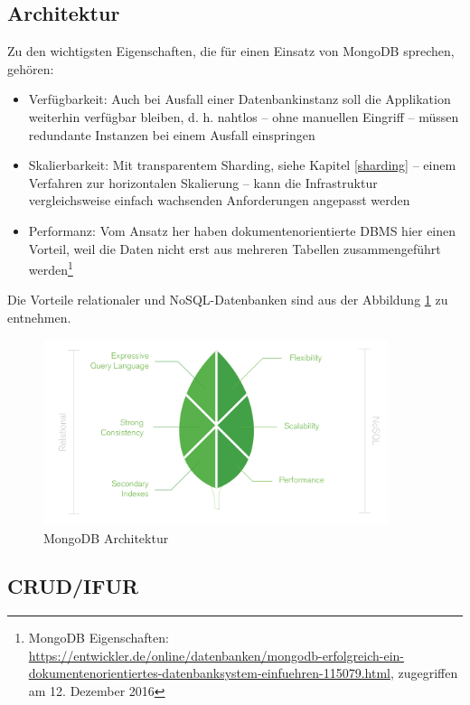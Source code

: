 \subsection{Architektur}
Zu den wichtigsten Eigenschaften, die für einen Einsatz von MongoDB sprechen, gehören:
\begin{itemize}
\item Verfügbarkeit: Auch bei Ausfall einer Datenbankinstanz soll die Applikation weiterhin verfügbar bleiben, d. h. nahtlos – ohne manuellen Eingriff – müssen redundante Instanzen bei einem Ausfall einspringen
\item Skalierbarkeit: Mit transparentem Sharding, siehe Kapitel \ref{sharding} – einem Verfahren zur horizontalen Skalierung – kann die Infrastruktur vergleichsweise einfach wachsenden Anforderungen angepasst werden
\item Performanz: Vom Ansatz her haben dokumentenorientierte DBMS hier einen Vorteil, weil die Daten nicht erst aus mehreren Tabellen zusammengeführt werden\footnote{MongoDB Eigenschaften: \url{https://entwickler.de/online/datenbanken/mongodb-erfolgreich-ein-dokumentenorientiertes-datenbanksystem-einfuehren-115079.html}, zugegriffen am 12. Dezember 2016}
\end{itemize}

Die Vorteile relationaler und NoSQL-Datenbanken sind aus der Abbildung \ref{img:architektur} zu entnehmen.
\begin{figure}
\centering
\includegraphics[width=0.9\textwidth]{resources/architectureNoSQLVSRelational}
\caption[MongoDB Architektur]{MongoDB Architektur\protect\footnotemark}
\label{img:architektur}
\end{figure}

\subsection{CRUD/IFUR}
